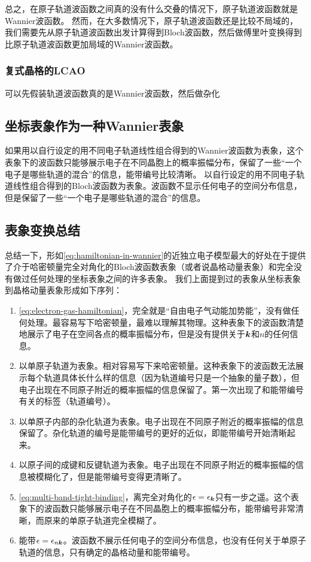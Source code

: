 总之，在原子轨道波函数之间真的没有什么交叠的情况下，原子轨道波函数就是Wannier波函数。
然而，在大多数情况下，原子轨道波函数还是比较不局域的，我们需要先从原子轨道波函数出发计算得到Bloch波函数，然后做傅里叶变换得到比原子轨道波函数更加局域的Wannier波函数。

\subsubsection{复式晶格的LCAO} 

可以先假装轨道波函数真的是Wannier波函数，然后做杂化


\subsection{坐标表象作为一种Wannier表象} 

如果用以自行设定的用不同电子轨道线性组合得到的Wannier波函数为表象，这个表象下的波函数只能够展示电子在不同晶胞上的概率振幅分布，保留了一些“一个电子是哪些轨道的混合”的信息，能带编号比较清晰。
以自行设定的用不同电子轨道线性组合得到的Bloch波函数为表象。波函数不显示任何电子的空间分布信息，但是保留了一些“一个电子是哪些轨道的混合”的信息。

\subsection{表象变换总结} 

总结一下，形如\eqref{eq:hamiltonian-in-wannier}的近独立电子模型最大的好处在于提供了介于哈密顿量完全对角化的Bloch波函数表象（或者说晶格动量表象）和完全没有做过任何处理的坐标表象之间的许多表象。
我们上面提到过的表象从坐标表象到晶格动量表象形成如下序列：
\begin{enumerate}
    \item \eqref{eq:electron-gas-hamiltonian}，完全就是“自由电子气动能加势能”，没有做任何处理。最容易写下哈密顿量，最难以理解其物理。这种表象下的波函数清楚地展示了电子在空间各点的概率振幅分布，但是没有提供关于$\vb*{k}$和$n$的任何信息。
    \item 以单原子轨道为表象。相对容易写下来哈密顿量。这种表象下的波函数无法展示每个轨道具体长什么样的信息（因为轨道编号只是一个抽象的量子数），但电子出现在不同原子附近的概率振幅的信息保留了。第一次出现了和能带编号有关的标签（轨道编号）。
    \item 以单原子内部的杂化轨道为表象。电子出现在不同原子附近的概率振幅的信息保留了。杂化轨道的编号是能带编号的更好的近似，即能带编号开始清晰起来。
    \item 以原子间的成键和反键轨道为表象。电子出现在不同原子附近的概率振幅的信息被模糊化了，但是能带编号变得更清晰了。
    \item \eqref{eq:multi-band-tight-binding}，离完全对角化的$\epsilon = \epsilon_{\vb*{k}}$只有一步之遥。这个表象下的波函数只能够展示电子在不同晶胞上的概率振幅分布，能带编号非常清晰，而原来的单原子轨道完全模糊了。
    \item 能带$\epsilon = \epsilon_{n\vb*{k}}$。波函数不展示任何电子的空间分布信息，也没有任何关于单原子轨道的信息，只有确定的晶格动量和能带编号。
\end{enumerate}


